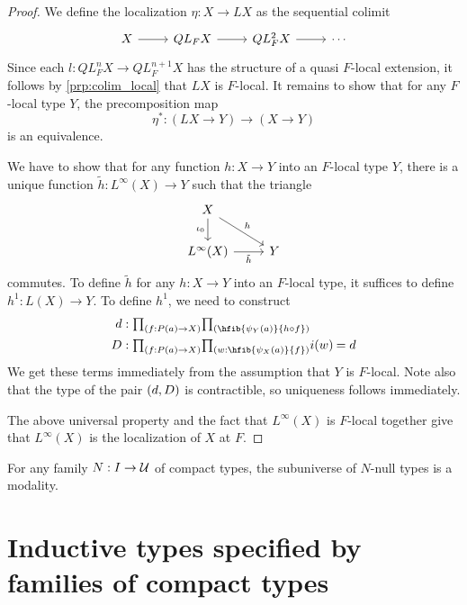 \begin{proof}
We define the localization $\eta:X\to LX$ as the sequential colimit
\begin{equation*}
\begin{tikzcd}
X \arrow[r] & QL_F X \arrow[r] & QL_F^2 X \arrow[r] & \cdots
\end{tikzcd}
\end{equation*}
Since each $l:QL_F^n X\to QL_F^{n+1}X$ has the structure of a quasi $F$-local extension, it follows by \cref{prp:colim_local} that $LX$ is $F$-local. It remains to show that for any $F$-local type $Y$, the precomposition map
\begin{equation*}
\eta^\ast : (LX\to Y)\to (X\to Y)
\end{equation*}
is an equivalence.

We have to show that for any function $h:X\to Y$ into an
$F$-local type $Y$, there is a unique function $\tilde{h}: L^\infty(X)\to
Y$ such that the triangle
\begin{equation*}
\begin{tikzcd}
X \arrow[dr,"h"] \arrow[d,swap,"\iota_0"] \\ 
L^\infty(X) \arrow[r,swap,"\tilde{h}"] & Y
\end{tikzcd}
\end{equation*}
commutes. To define $\tilde{h}$ for any $h:X\to Y$ into an $F$-local type, 
it suffices to define $h^1:L(X)\to Y$. To define $h^1$, we need to construct
\begin{align*}
d & : \prd{f:P(a)\to X} \hfib{\psi_Y(a)}{h\circ f}\\
D & : \prd{f:P(a)\to X}{w:\hfib{\psi_{X}(a)}{f}}\id{i(w)}{d}
\end{align*}
We get these terms immediately from the assumption that $Y$ is $F$-local.
Note also that the type of the pair ${\mathopen{}(d,D)\mathclose{}}$ is contractible, so uniqueness
follows immediately.

The above universal property and the fact that $L^\infty(X)$ is $F$-local
together give that $L^\infty(X)$ is the localization of $X$ at $F$.
\end{proof}

\begin{cor}
For any family $N:I\to \mathcal{U}$ of compact types, the subuniverse of $N$-null types is a modality.
\end{cor}

\section{Inductive types specified by families of compact types}
